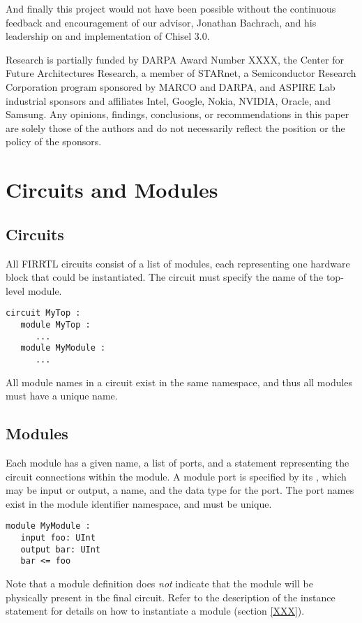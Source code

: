 \documentclass[12pt]{article}
\begin{document}
And finally this project would not have been possible without the continuous feedback and encouragement of our advisor, Jonathan Bachrach, and his leadership on and implementation of Chisel 3.0.

Research is partially funded by DARPA Award Number XXXX, the Center for Future Architectures Research, a member of STARnet, a Semiconductor Research Corporation program sponsored by MARCO and DARPA, and ASPIRE Lab industrial sponsors and affiliates Intel, Google, Nokia, NVIDIA, Oracle, and Samsung. Any opinions, findings, conclusions, or recommendations in this paper are solely those of the authors and do not necessarily reflect the position or the policy of the sponsors.

\section{Circuits and Modules}

\subsection{Circuits}
All FIRRTL circuits consist of a list of modules, each representing one hardware block that could be instantiated. The circuit must specify the name of the top-level module.

\begin{verbatim}
circuit MyTop :
   module MyTop :
      ...
   module MyModule :
      ...   
\end{verbatim}   

All module names in a circuit exist in the same namespace, and thus all modules must have a unique name. 

\subsection{Modules}
Each module has a given name, a list of ports, and a statement representing the circuit connections within the module. A module port is specified by its , which may be input or output, a name, and the data type for the port. The port names exist in the module identifier namespace, and must be unique.

\begin{verbatim}
module MyModule :
   input foo: UInt
   output bar: UInt
   bar <= foo
\end{verbatim}  

Note that a module definition does {\em not} indicate that the module will be physically present in the final circuit. Refer to the description of the instance statement for details on how to instantiate a module (section \ref{XXX}).
\end{document}
